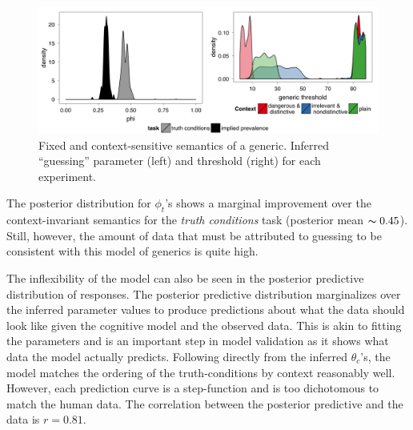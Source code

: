 \documentclass[10pt,letterpaper]{article}
\begin{document}
\begin{figure}
\centering
    \includegraphics[width=\columnwidth]{fixed_phis_thetas}
    \caption{Fixed and context-sensitive semantics of a generic. Inferred ``guessing'' parameter (left) and threshold (right) for each experiment.}
  \label{fig:justFixed}
\end{figure}

The posterior distribution for $\phi_{t}$'s shows a marginal improvement over the context-invariant semantics for the \emph{truth conditions} task (posterior mean $\thicksim 0.45$). Still, however, the amount of data that must be attributed to guessing to be consistent with this model of generics is quite high.

The inflexibility of the model can also be seen in the posterior predictive distribution of responses. 
The posterior predictive distribution marginalizes over the inferred parameter values to produce predictions about what the data should look like given the cognitive model and the observed data. This is akin to fitting the parameters and is an important step in model validation as it shows what data the model actually predicts.
Following directly from the inferred $\theta_{c}$'s, the model matches the ordering of the truth-conditions by context reasonably well. However, each prediction curve is a step-function and is too dichotomous to match the human data. The correlation between the posterior predictive and the data is $r = 0.81$. 
\end{document}
